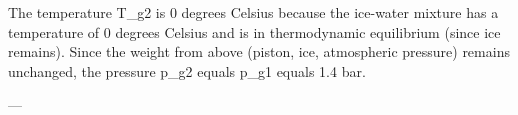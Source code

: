 The temperature T_g2 is 0 degrees Celsius because the ice-water mixture has a temperature of 0 degrees Celsius and is in thermodynamic equilibrium (since ice remains).  
Since the weight from above (piston, ice, atmospheric pressure) remains unchanged, the pressure p_g2 equals p_g1 equals 1.4 bar.  

---